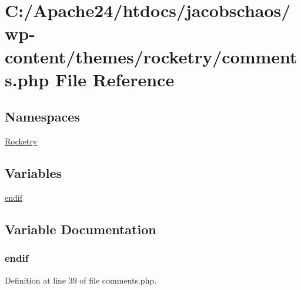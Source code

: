 \hypertarget{comments_8php}{}\section{C\+:/\+Apache24/htdocs/jacobschaos/wp-\/content/themes/rocketry/comments.php File Reference}
\label{comments_8php}
\subsection*{Namespaces}
\begin{DoxyCompactItemize}
\item 
 \hyperlink{namespace_rocketry}{Rocketry}
\end{DoxyCompactItemize}
\subsection*{Variables}
\begin{DoxyCompactItemize}
\item 
\hyperlink{comments_8php_a82cd33ca97ff99f2fcc5e9c81d65251b}{endif}
\end{DoxyCompactItemize}


\subsection{Variable Documentation}
\hypertarget{comments_8php_a82cd33ca97ff99f2fcc5e9c81d65251b}{}
\subsubsection[{endif}]{\setlength{\rightskip}{0pt plus 5cm}endif}\label{comments_8php_a82cd33ca97ff99f2fcc5e9c81d65251b}


Definition at line 39 of file comments.\+php.

